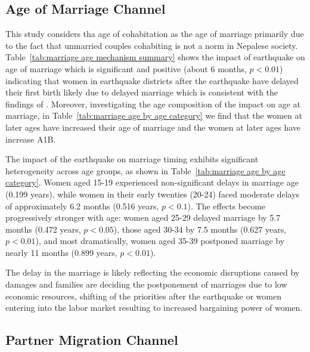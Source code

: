 \documentclass[11pt,a4paper]{article}
\begin{document}
\vspace{0.25cm}

\subsection{Age of Marriage Channel}
This study considers tha age of cohabitation as the age of marriage primarily due to the fact that unmarried couples cohabiting is not a norm in Nepalese society. Table~\ref{tab:marriage age mechanism summary} shows the impact of earthquake on age of marriage which is significant and positive (about 6 months, $p<0.01$) indicating that women in earthquake districts after the earthquake have delayed their first birth likely due to delayed marriage which is consistent with the findings of \citet{baizan2003cohabitation}. Moreover, investigating the age composition of the impact on age at marriage, in Table~\ref{tab:marriage age by age category} we find that the women at later ages have increased their age of marriage and the women at later ages have increase A1B. 

\vspace{0.25cm}

The impact of the earthquake on marriage timing exhibits significant heterogeneity across age groups, as shown in Table~\ref{tab:marriage age by age category}. Women aged 15-19 experienced non-significant delays in marriage age (0.199 years), while women in their early twenties (20-24) faced moderate delays of approximately 6.2 months (0.516 years, $p < 0.1$). The effects become progressively stronger with age: women aged 25-29 delayed marriage by 5.7 months (0.472 years, $p < 0.05$), those aged 30-34 by 7.5 months (0.627 years, $p < 0.01$), and most dramatically, women aged 35-39 postponed marriage by nearly 11 months (0.899 years, $p < 0.01$).

\vspace{0.25cm}

The delay in the marriage is likely reflecting the economic disruptions caused by damages and families are deciding the postponement of marriages due to low economic resources, shifting of the priorities after the earthquake or women entering into the labor market resulting to increased bargaining power of women. 

\vspace{0.25cm}

\subsection{Partner Migration Channel}
\end{document}
